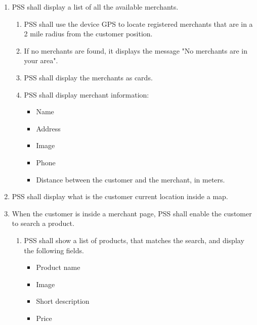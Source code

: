 \begin{enumerate}[resume, label=SY-\arabic*]
\begin{itemize}
    \end{itemize}
    \item PSS shall display a list of all the available merchants.
    \begin{enumerate}[label=SY-8.\arabic*]
        \item PSS shall use the device GPS to locate registered merchants that 
        are in a 2 mile radius from the customer position.
        \item If no merchants are found, it displays the message "No merchants 
        are in your area".
        \item PSS shall display the merchants as 
        cards. \cite{material-design-cards}
        \item PSS shall display merchant information: 
        \begin{itemize}
            \item Name
            \item Address
            \item Image
            \item Phone
            \item Distance between the customer and the merchant, in meters.
        \end{itemize}
    \end{enumerate}
    \item PSS shall display what is the customer current location 
    inside a map.
    \item When the customer is inside a merchant page, PSS shall enable the 
    customer to search a product.
    \begin{enumerate}[label=SY-10.\arabic*]
        \item PSS shall show a list of products, that matches the search, 
        and display the following fields.
        \begin{itemize}
            \item Product name
            \item Image 
            \item Short description
            \item Price
        \end{itemize}
    \end{enumerate}
    \end{enumerate}
